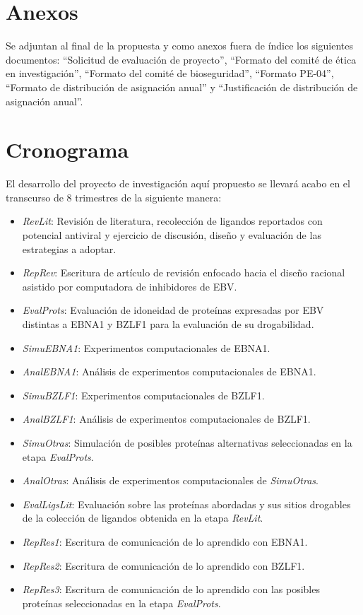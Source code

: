\documentclass[12pt,letterpaper]{article} %
\begin{document}
\section{Anexos}

Se adjuntan al final de la propuesta y como anexos fuera de índice los
siguientes documentos: ``Solicitud de evaluación de proyecto'', ``Formato del
comité de ética en investigación'', ``Formato del comité de bioseguridad'',
``Formato PE-04'', ``Formato de distribución de asignación anual'' y
``Justificación de distribución de asignación anual''.

\section{Cronograma}

El desarrollo del proyecto de investigación aquí propuesto se llevará acabo en
el transcurso de 8 trimestres de la siguiente manera:

\begin{itemize}
\item \emph{RevLit}: Revisión de literatura, recolección de ligandos reportados
  con potencial antiviral y ejercicio de discusión, diseño y evaluación de las
  estrategias a adoptar.
	\item \emph{RepRev}: Escritura de artículo de revisión enfocado hacia el diseño
    racional asistido por computadora de inhibidores de EBV.
	\item \emph{EvalProts}: Evaluación de idoneidad de proteínas expresadas por
    EBV distintas a EBNA1 y BZLF1 para la evaluación de su drogabilidad.
	\item \emph{SimuEBNA1}: Experimentos computacionales de EBNA1. 
	\item \emph{AnalEBNA1}: Análisis de experimentos computacionales de EBNA1.
	\item \emph{SimuBZLF1}: Experimentos computacionales de BZLF1.
	\item \emph{AnalBZLF1}: Análisis de experimentos computacionales de BZLF1. 
	\item \emph{SimuOtras}: Simulación de posibles proteínas alternativas
    seleccionadas en la etapa \emph{EvalProts}.
	\item \emph{AnalOtras}: Análisis de experimentos computacionales de \emph{SimuOtras}.
	\item \emph{EvalLigsLit}: Evaluación sobre las proteínas abordadas y sus
    sitios drogables de la colección de ligandos obtenida en la etapa \emph{RevLit}.
	\item \emph{RepRes1}: Escritura de comunicación de lo aprendido con EBNA1.
	\item \emph{RepRes2}: Escritura de comunicación de lo aprendido con BZLF1.
	\item \emph{RepRes3}: Escritura de comunicación de lo aprendido con las
    posibles proteínas seleccionadas en la etapa \emph{EvalProts}.
  \end{itemize}
  
\end{document}
